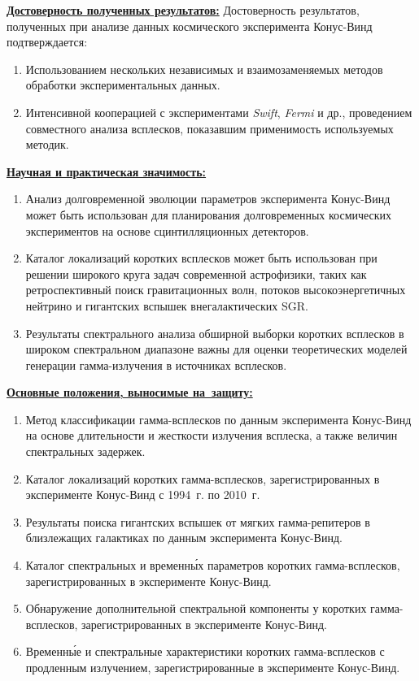 \underline{\textbf{Достоверность полученных результатов:}}
Достоверность результатов, полученных при анализе данных космического
эксперимента Конус-Винд подтверждается:
\begin{enumerate}
\item Использованием нескольких независимых и взаимозаменяемых методов обработки экспериментальных данных.
\item Интенсивной кооперацией с экспериментами \textit{Swift}, \textit{Fermi} и др.,
проведением совместного анализа всплесков, показавшим применимость используемых методик.
\end{enumerate}

\underline{\textbf{Научная и практическая значимость:}} 
\begin{enumerate}
\item Анализ долговременной эволюции параметров эксперимента Конус-Винд может быть использован
 для планирования долговременных космических экспериментов на основе сцинтилляционных детекторов.
\item Каталог локализаций коротких всплесков может быть использован при решении 
 широкого круга задач современной астрофизики, таких как ретроспективный поиск гравитационных волн, потоков 
 высокоэнергетичных нейтрино и гигантских вспышек внегалактических SGR.
\item Результаты спектрального анализа обширной выборки коротких всплесков 
 в широком спектральном диапазоне важны для оценки теоретических 
 моделей генерации гамма-излучения в источниках всплесков.
\end{enumerate}

\clearpage

\underline{\textbf{Основные положения, выносимые на~защиту:}}
\begin{enumerate}
\item Метод классификации гамма-всплесков по данным эксперимента Конус-Винд на основе
    длительности и жесткости излучения всплеска, а также величин спектральных задержек.
\item Каталог локализаций коротких гамма-всплесков, зарегистрированных в эксперименте
    Конус-Винд с 1994~г. по 2010~г.
\item Результаты поиска гигантских вспышек от мягких гамма-репитеров 
    в близлежащих галактиках по данным эксперимента Конус-Винд. 
\item Каталог спектральных и временн\'{ы}х параметров коротких гамма-всплесков, 
    зарегистрированных в эксперименте Конус-Винд.
\item Обнаружение дополнительной спектральной компоненты у коротких гамма-всплесков, 
    зарегистрированных в эксперименте Конус-Винд.
\item Временн\'{ы}е и спектральные характеристики коротких гамма-всплесков 
    с продленным излучением, зарегистрированные в эксперименте Конус-Винд.
\end{enumerate}


